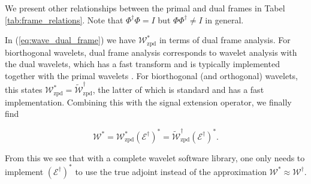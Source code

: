\documentclass[journal]{IEEEtran}
\newcommand{\dual}{\widetilde}
\begin{document}
   \noindent We present other relationships between the primal and dual frames in Tabel \ref{tab:frame_relations}.  Note that $\Phi^\dagger\Phi=I$ but $\Phi\Phi^\dagger\neq I$ in general.

   In (\ref{eq:wave_dual_frame}) we have $\mathcal{W}_\text{zpd}^\ast$ in terms of dual frame analysis.  For biorthogonal wavelets, dual frame analysis corresponds to wavelet analysis with the dual wavelets, which has a fast transform and is typically implemented together with the primal wavelets \cite{matlab_wt_2015}.  For biorthogonal (and orthogonal) wavelets, this states $\mathcal{W}^\ast_\text{zpd}=\dual{\mathcal{W}}_\text{zpd}^\dagger$, the latter of which is standard and has a fast implementation.  Combining this with the signal extension operator, we finally find

   \begin{equation}
   \label{eq:full_wave_adjoint}
      \mathcal{W}^\ast = \mathcal{W}_\text{zpd}^\ast\left(\mathcal{E}^\dagger\right)^\ast = \dual{\mathcal{W}}_\text{zpd}^\dagger\left(\mathcal{E}^\dagger\right)^\ast.
   \end{equation}
   
   \noindent From this we see that with a complete wavelet software library, one only needs to implement $(\mathcal{E}^\dagger)^\ast$ to use the true adjoint instead of the approximation $\mathcal{W}^\ast\approx\mathcal{W}^\dagger$.


\end{document}
